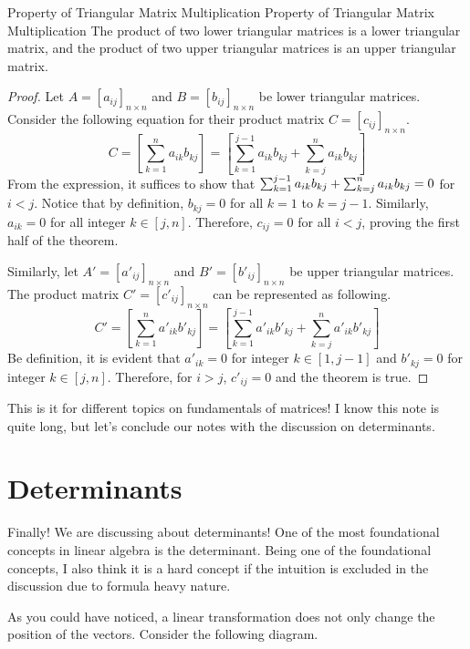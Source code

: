 \documentclass[../main.tex]{subfiles}
\begin{document}
\begin{theorem}{Property of Triangular Matrix Multiplication}
{Property of Triangular Matrix Multiplication}
The product of two lower triangular matrices is a lower triangular
matrix, and the product of two upper triangular matrices is an upper
triangular matrix.
\end{theorem}
\begin{proof}
Let $A = [a_{ij}]_{n \times n}$ and $B = [b_{ij}]_{n \times n}$ be
lower triangular matrices. Consider the following equation for their
product matrix $C = [c_{ij}]_{n \times n}$.
\[
C
= \left[ \sum_{k = 1}^{n} a_{ik} b_{kj} \right]
= \left[
    \sum_{k = 1}^{j-1} a_{ik} b_{kj}
        + \sum_{k = j}^{n} a_{ik} b_{kj}
\right]
\]
From the expression, it suffices to show that $\sum_{k = 1}^{j-1}
a_{ik} b_{kj} + \sum_{k = j}^{n} a_{ik} b_{kj} \linebreak = 0$ for
$i < j$. Notice that by definition, $b_{kj} = 0$ for all $k = 1$ to
$k = j-1$. Similarly, $a_{ik} = 0$ for all integer $k \in [j, n]$.
Therefore, $c_{ij} = 0$ for all $i < j$, proving the first half of
the theorem.

Similarly, let $A' = [a'_{ij}]_{n \times n}$ and $B' =
[b'_{ij}]_{n \times n}$ be upper triangular matrices. The product
matrix $C'= [c'_{ij}]_{n \times n}$ can be represented as following.
\[
C'
= \left[ \sum_{k = 1}^{n} a'_{ik} b'_{kj} \right]
= \left[
    \sum_{k = 1}^{j-1} a'_{ik} b'_{kj}
        + \sum_{k = j}^{n} a'_{ik} b'_{kj}
\right]
\]
Be definition, it is evident that $a'_{ik} = 0$ for integer $k
\in [1, j-1]$ and $b'_{kj} = 0$ for integer $k \in [j, n]$.
Therefore, for $i > j$, $c'_{ij} = 0$ and the theorem is true.
\end{proof}

This is it for different topics on fundamentals of matrices! I know
this note is quite long, but let's conclude our notes with the
discussion on determinants.

\section{Determinants}

Finally! We are discussing about determinants! One of the most
foundational concepts in linear algebra is the determinant. Being one
of the foundational concepts, I also think it is a hard concept if the
intuition is excluded in the discussion due to formula heavy nature.

As you could have noticed, a linear transformation does not only
change the position of the vectors. Consider the following diagram.
\end{document}
